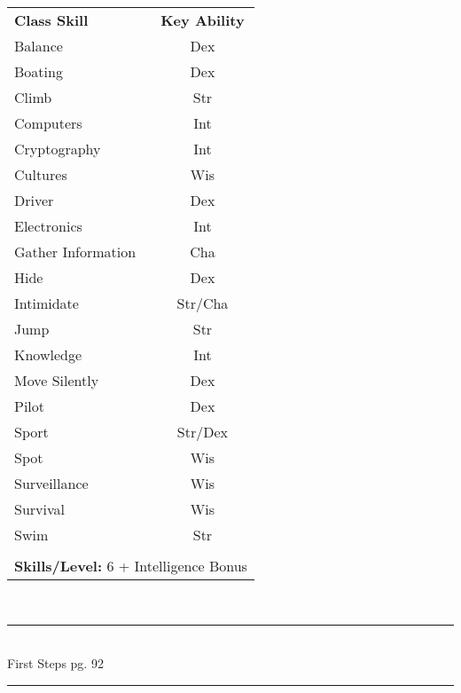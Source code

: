 \begin{table}[htb]
\raggedright
\begin{tabular}{l c}
\textbf{Class Skill} & \textbf{Key Ability}\\

Balance & Dex\\
Boating & Dex\\
Climb & Str\\
Computers & Int\\
Cryptography & Int\\
Cultures & Wis\\
Driver & Dex\\
Electronics & Int\\
Gather Information & Cha\\
Hide & Dex\\
Intimidate & Str/Cha\\
Jump & Str\\
Knowledge & Int\\
Move Silently & Dex\\
Pilot & Dex\\
Sport & Str/Dex\\
Spot & Wis\\
Surveillance & Wis\\
Survival & Wis\\
Swim & Str\\


\multicolumn{2}{l}{\cellcolor{white}}\\
\multicolumn{2}{l}{\cellcolor{white}\textbf{Skills/Level:} 6 + Intelligence Bonus}\\
\end{tabular}
\end{table}

\setlength{\intextsep}{14.0pt plus 4.0pt minus 4.0pt}

\vspace*{1cm}

\vspace*{\fill}

\begin{center}
\textsc{\Large}\\[0.25cm]
\rule{\linewidth}{0.5mm}\\[0.6cm]
\fontsize{30}{30} \selectfont First Steps pg. 92\\
\rule{\linewidth}{0.5mm}\\[0.6cm]
\vfill
\end{center}

\pagebreak



